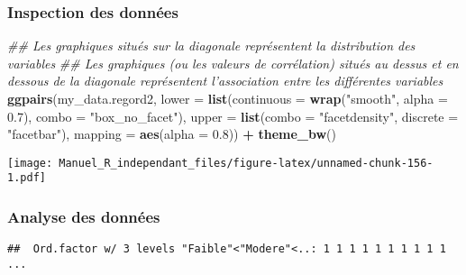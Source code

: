 \documentclass[
]{book}
\newenvironment{Shaded}{\begin{snugshade}}{\end{snugshade}}
\newcommand{\CommentTok}[1]{\textcolor[rgb]{0.56,0.35,0.01}{\textit{#1}}}
\newcommand{\DataTypeTok}[1]{\textcolor[rgb]{0.13,0.29,0.53}{#1}}
\newcommand{\FloatTok}[1]{\textcolor[rgb]{0.00,0.00,0.81}{#1}}
\newcommand{\KeywordTok}[1]{\textcolor[rgb]{0.13,0.29,0.53}{\textbf{#1}}}
\newcommand{\NormalTok}[1]{#1}
\newcommand{\OperatorTok}[1]{\textcolor[rgb]{0.81,0.36,0.00}{\textbf{#1}}}
\newcommand{\StringTok}[1]{\textcolor[rgb]{0.31,0.60,0.02}{#1}}
\begin{document}
\hypertarget{inspection-des-donnuxe9es-17}{%
\subsubsection{Inspection des données}\label{inspection-des-donnuxe9es-17}}

\begin{Shaded}
\begin{Highlighting}[]
\CommentTok{## Les graphiques situés sur la diagonale représentent la distribution des variables}
\CommentTok{## Les graphiques (ou les valeurs de corrélation) situés au dessus et en dessous de la diagonale représentent l'association entre les différentes variables}
\KeywordTok{ggpairs}\NormalTok{(my_data.regord2,}
        \DataTypeTok{lower =} \KeywordTok{list}\NormalTok{(}\DataTypeTok{continuous =} \KeywordTok{wrap}\NormalTok{(}\StringTok{"smooth"}\NormalTok{, }\DataTypeTok{alpha =} \FloatTok{0.7}\NormalTok{), }\DataTypeTok{combo =} \StringTok{"box_no_facet"}\NormalTok{),}
        \DataTypeTok{upper =} \KeywordTok{list}\NormalTok{(}\DataTypeTok{combo =} \StringTok{"facetdensity"}\NormalTok{, }\DataTypeTok{discrete =} \StringTok{"facetbar"}\NormalTok{), }
        \DataTypeTok{mapping =} \KeywordTok{aes}\NormalTok{(}\DataTypeTok{alpha =} \FloatTok{0.8}\NormalTok{)) }\OperatorTok{+}\StringTok{ }\KeywordTok{theme_bw}\NormalTok{()}
\end{Highlighting}
\end{Shaded}

\texttt{[image: Manuel\_R\_independant\_files/figure-latex/unnamed-chunk-156-1.pdf]}

\hypertarget{analyse-des-donnuxe9es-18}{%
\subsubsection{Analyse des données}\label{analyse-des-donnuxe9es-18}}

\begin{Shaded}
\end{Shaded}

\begin{verbatim}
##  Ord.factor w/ 3 levels "Faible"<"Modere"<..: 1 1 1 1 1 1 1 1 1 1 ...
\end{verbatim}
\end{document}

